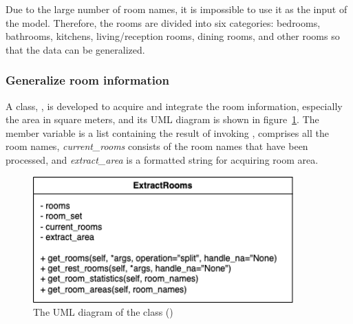 \documentclass[12pt,twoside]{report}
\begin{document}
Due to the large number of room names, it is impossible to use it as the input of the model. Therefore, the rooms are divided into six categories: bedrooms, bathrooms, kitchens, living/reception rooms, dining rooms, and other rooms so that the data can be generalized. 
\\

\subsubsection{Generalize room information}
A class, , is developed to acquire and integrate the room information, especially the area in square meters, and its UML diagram is shown in \mbox{figure \ref{uml_extract_rooms}}. The member variable  is a list containing the result of invoking ,  comprises all the room names, \colorbox{light-gray}{\textit{current\_rooms}} consists of the room names that have been processed, and \colorbox{light-gray}{\textit{extract\_area}} is a formatted string for acquiring room area. 
\\

\begin{figure}[!htbp]
	\centering
	\includegraphics[width=10cm]{uml_extract_rooms}
	\caption{The UML diagram of the class ()}
	\label{uml_extract_rooms}
\end{figure}
\end{document}
